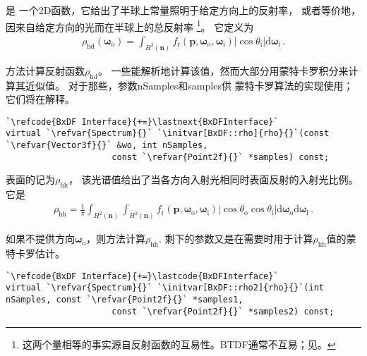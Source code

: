 是
一个2D函数，它给出了半球上常量照明于给定方向上的反射率，
或者等价地，因来自给定方向的光而在半球上的总反射率
\footnote{这两个量相等的事实源自反射函数的互易性。BTDF通常不互易；见。}。
它定义为
\begin{align}
    \label{eq:8.1}
    \rho_{\mathrm{hd}}({\bm\omega}_{\mathrm{o}})=\int_{H^2({\bm n})}{f_{\mathrm{r}}({\bm p},{\bm \omega}_\mathrm{o},{\bm \omega}_\mathrm{i})|\cos{\theta_{\mathrm{i}}}|\mathrm{d}{\bm \omega}_\mathrm{i}}\, .
\end{align}

方法计算反射函数$\rho_{\mathrm{hd}}$。
一些能解析地计算该值，然而大部分用蒙特卡罗积分来计算其近似值。
对于那些，参数{\ttfamily nSamples}和{\ttfamily samples}供
蒙特卡罗算法的实现使用；它们将在解释。
\begin{lstlisting}
`\refcode{BxDF Interface}{+=}\lastnext{BxDFInterface}`
virtual `\refvar{Spectrum}{}` `\initvar[BxDF::rho]{rho}{}`(const `\refvar{Vector3f}{}` &wo, int nSamples,
                     const `\refvar{Point2f}{}` *samples) const;
\end{lstlisting}

表面的记为$\rho_{\mathrm{hh}}$，
该光谱值给出了当各方向入射光相同时表面反射的入射光比例。它是
\begin{align*}
    \rho_{\mathrm{hh}}=\frac{1}{\pi}\int_{H^2({\bm n})}\int_{H^2({\bm n})}f_{\mathrm{r}}({\bm p},{\bm \omega}_\mathrm{o},{\bm \omega}_\mathrm{i})|\cos{\theta_{\mathrm{o}}}\cos{\theta_{\mathrm{i}}}|\mathrm{d}{\bm \omega}_\mathrm{o}\mathrm{d}{\bm \omega}_\mathrm{i}\, .
\end{align*}

如果不提供方向${\bm\omega}_\mathrm{o}$，则方法计算$\rho_{\mathrm{hh}}$.
剩下的参数又是在需要时用于计算$\rho_{\mathrm{hh}}$值的蒙特卡罗估计。
\begin{lstlisting}
`\refcode{BxDF Interface}{+=}\lastcode{BxDFInterface}`
virtual `\refvar{Spectrum}{}` `\initvar[BxDF::rho2]{rho}{}`(int nSamples, const `\refvar{Point2f}{}` *samples1,
                     const `\refvar{Point2f}{}` *samples2) const;
\end{lstlisting}

